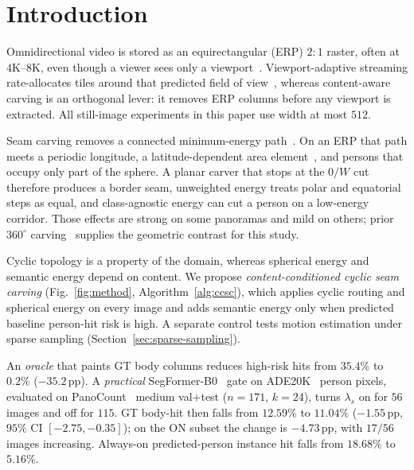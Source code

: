 \section{Introduction}
\label{sec:intro}

Omnidirectional video is stored as an equirectangular (ERP)
$2{:}1$ raster, often at $4$K--$8$K, even though a viewer sees
only a
viewport~\cite{hosseini2016adaptive,corbillon2017viewport,graf2017omnidirectional,qian2018flare}.
Viewport-adaptive streaming rate-allocates tiles around that
predicted field of view~\cite{corbillon2017optimal}, whereas
content-aware carving is an orthogonal lever: it removes ERP
columns before any viewport is extracted. All still-image
experiments in this paper use width at most $512$.

Seam carving removes a connected minimum-energy
path~\cite{avidan2007seam}. On an ERP that path meets a periodic
longitude, a latitude-dependent area
element~\cite{coors2018spherenet,cheng2018cubepadding}, and
persons that occupy only part of the sphere. A planar carver
that stops at the $0/W$ cut therefore produces a border seam,
unweighted energy treats polar and equatorial steps as equal,
and class-agnostic energy can cut a person on a low-energy
corridor. Those effects are strong on some panoramas and mild on
others; prior $360^\circ$
carving~\cite{tsubaki2018interrupted,choi2021distortion}
supplies the geometric contrast for this study.

Cyclic topology is a property of the domain, whereas spherical
energy and semantic energy depend on content. We propose
\emph{content-conditioned cyclic seam carving}
(Fig.~\ref{fig:method}, Algorithm~\ref{alg:ccsc}), which applies
cyclic routing and spherical energy on every image and adds
semantic energy only when predicted baseline person-hit risk is
high. A separate control tests motion estimation under sparse
sampling (Section~\ref{sec:sparse-sampling}).

An \emph{oracle} that paints GT body columns reduces high-risk
hits from $35.4\%$ to $0.2\%$ ($-35.2$\,pp). A \emph{practical}
SegFormer-B0~\cite{xie2021segformer} gate on
{ADE20K}~\cite{zhou2017ade20k} person pixels, evaluated on
PanoCount~\cite{arbi2025panocount} medium val+test ($n=171$,
$k=24$), turns $\lambda_s$ on for $56$ images and off for $115$.
GT body-hit then falls from $12.59\%$ to $11.04\%$ ($-1.55$\,pp,
$95\%$ CI $[-2.75,-0.35]$); on the ON subset the change is
$-4.73$\,pp, with $17/56$ images increasing. Always-on
predicted-person instance hit falls from $18.68\%$ to $5.16\%$.


